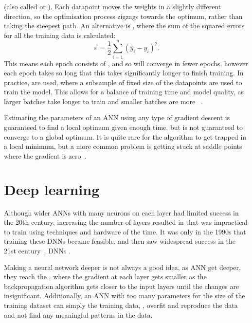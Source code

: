   (also called  or ).
Each datapoint moves the weights in a slightly different direction, so the optimisation process zigzags towards the optimum, rather than taking the steepest path.
An alternative is , where the sum of the squared errors for all the training data is calculated:
\[ \vec{\varepsilon} = \frac{1}{2} \sum_{i = 1}^{n}\left(\hat{y}_i - y_i\right)^2. \]
This means each epoch consists of , and so will converge in fewer epochs, however each epoch takes so long that this takes significantly longer to finish training.
In practice,  are used, where a subsample of fixed size of the datapoints are used to train the model.
This allows for a balance of training time and model quality, as larger batches take longer to train and smaller batches are more ~\autocite[59]{thoma2017}.

Estimating the parameters of an \acl{ANN} using any type of gradient descent is guaranteed to find a local optimum given enough time, but is not guaranteed to converge to a global optimum.
It is quite rare for the algorithm to get trapped in a local minimum, but a more common problem is getting stuck at saddle points where the gradient is zero~\autocite[438]{lecun2015}.

\section{Deep learning} \label{sec:deep-learning}

Although wider \aclp{ANN} with many neurons on each layer had limited success in the 20th century, increasing the number of layers resulted in  that was impractical to train using techniques and hardware of the time.
It was only in the 1990s that training these \acp{DNN} became feasible, and then saw widespread success in the 21st century~\autocite[86]{schmidhuber2015}.
\acp{DNN} .

Making a neural network deeper is not always a good idea, as \acl{ANN} get deeper, they reach the , where the gradient at each layer gets smaller as the backpropagation algorithm gets closer to the input layers until the changes are insignificant.
Additionally, an \acl{ANN} with too many parameters for the size of the training dataset can simply  the training data, \ie{}, overfit and reproduce the data and not find any meaningful patterns in the data.

